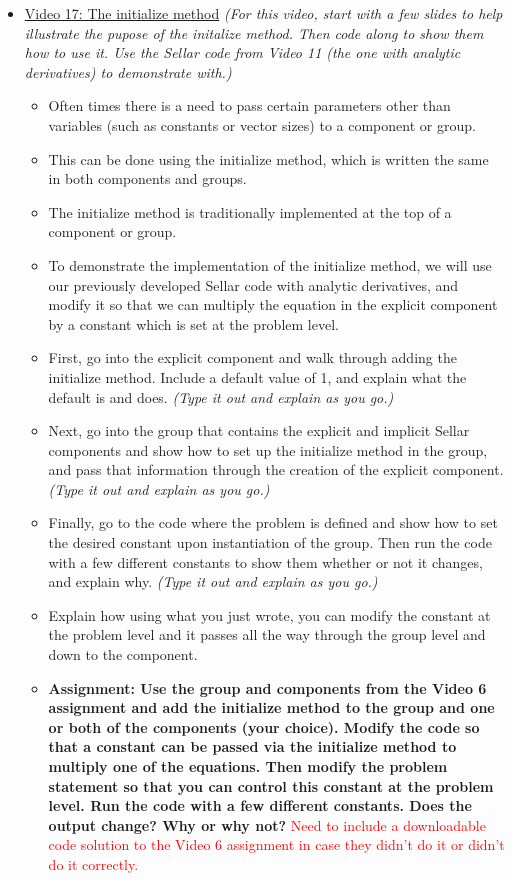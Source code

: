 \documentclass[12pt, letterpaper]{article}
\begin{document}
\begin{itemize}
	\item \underline{Video 17: The initialize method} \textit{(For this video, start with a few slides to help illustrate the pupose of the initalize method. Then code along to show them how to use it. Use the Sellar code from Video 11 (the one with analytic derivatives) to demonstrate with.)}
		\begin{itemize}
			\item Often times there is a need to pass certain parameters other than variables (such as constants or vector sizes) to a component or group.
			\item This can be done using the initialize method, which is written the same in both components and groups.
			\item The initialize method is traditionally implemented at the top of a component or group.
			\item To demonstrate the implementation of the initialize method, we will use our previously developed Sellar code with analytic derivatives, and modify it so that we can multiply the equation in the explicit component by a constant which is set at the problem level. 
			\item First, go into the explicit component and walk through adding the initialize method. Include a default value of 1, and explain what the default is and does. \textit{(Type it out and explain as you go.)}
			\item Next, go into the group that contains the explicit and implicit Sellar components and show how to set up the initialize method in the group, and pass that information through the creation of the explicit component. \textit{(Type it out and explain as you go.)}
			\item Finally, go to the code where the problem is defined and show how to set the desired constant upon instantiation of the group. Then run the code with a few different constants to show them whether or not it changes, and explain why. \textit{(Type it out and explain as you go.)}
			\item Explain how using what you just wrote, you can modify the constant at the problem level and it passes all the way through the group level and down to the component.
			\item \textbf{Assignment: Use the group and components from the Video 6 assignment and add the initialize method to the group and one or both of the components (your choice). Modify the code so that a constant can be passed via the initialize method to multiply one of the equations. Then modify the problem statement so that you can control this constant at the problem level. Run the code with a few different constants. Does the output change? Why or why not?} \textcolor{red}{Need to include a downloadable code solution to the Video 6 assignment in case they didn't do it or didn't do it correctly.}
		\end{itemize}
		

\end{itemize}
\end{document}
